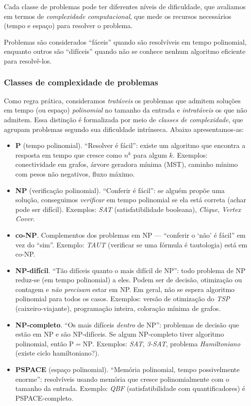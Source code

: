 Cada classe de problemas pode ter diferentes níveis de dificuldade, que avaliamos em termos de \emph{complexidade computacional}, que mede os recursos necessários (tempo e espaço) para resolver o problema.

Problemas são considerados ``fáceis'' quando são resolvíveis em tempo polinomial, enquanto outros são ``difíceis'' quando não se conhece nenhum algoritmo eficiente para resolvê-los.

\subsubsection{Classes de complexidade de problemas}


Como regra prática, consideramos \emph{tratáveis} os problemas que admitem soluções em tempo (ou espaço) \emph{polinomial} no tamanho da entrada e \emph{intratáveis} os que não admitem. Essa distinção é formalizada por meio de \emph{classes de complexidade}, que agrupam problemas segundo sua dificuldade intrínseca. Abaixo apresentamos-as:

\begin{itemize}\setlength{\itemsep}{2pt}
	\item \textbf{P} (tempo polinomial). “Resolver é fácil”: existe um algoritmo que encontra a resposta em tempo que cresce como \(n^k\) para algum \(k\). Exemplos: conectividade em grafos, árvore geradora mínima (MST), caminho mínimo com pesos não negativos, fluxo máximo.
	\item \textbf{NP} (verificação polinomial). “Conferir é fácil”: se alguém propõe uma solução, conseguimos \emph{verificar} em tempo polinomial se ela está correta (achar pode ser difícil). Exemplos: \emph{SAT} (satisfatibilidade booleana), \emph{Clique}, \emph{Vertex Cover}.
	\item \textbf{co-NP}. Complementos dos problemas em NP — “conferir o ‘não’ é fácil” em vez do “sim”. Exemplo: \emph{TAUT} (verificar se uma fórmula é tautologia) está em co-NP.
	\item \textbf{NP-difícil}. “Tão difíceis quanto o mais difícil de NP”: todo problema de NP reduz-se (em tempo polinomial) a eles. Podem ser de decisão, otimização ou contagem e \emph{não precisam} estar em NP. Em geral, não se espera algoritmo polinomial para todos os casos. Exemplos: versão de otimização do \emph{TSP} (caixeiro-viajante), programação inteira, coloração mínima de grafos.
	\item \textbf{NP-completo}. “Os mais difíceis \emph{dentro} de NP”: problemas de decisão que estão em NP e são NP-difíceis. Se algum NP-completo tiver algoritmo polinomial, então \(\mathrm{P}=\mathrm{NP}\). Exemplos: \emph{SAT}, \emph{3-SAT}, problema \emph{Hamiltoniano} (existe ciclo hamiltoniano?).
	\item \textbf{PSPACE} (espaço polinomial). “Memória polinomial, tempo possivelmente enorme”: resolvíveis usando memória que cresce polinomialmente com o tamanho da entrada. Exemplo: \emph{QBF} (satisfatibilidade com quantificadores) é PSPACE-completo.
\end{itemize}

